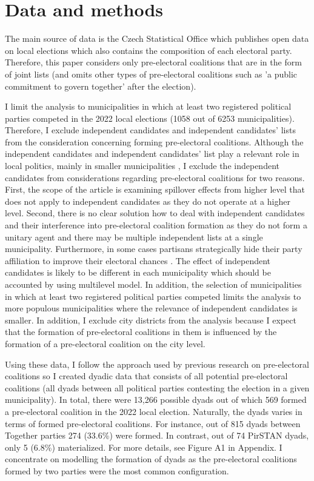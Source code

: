 \documentclass[]{interact}
\theoremstyle{plain}%
\theoremstyle{definition}
\theoremstyle{remark}
\begin{document}
\section{Data and methods}

The main source of data is the Czech Statistical Office which publishes open data on local elections which also contains the composition of each electoral party. Therefore, this paper considers only pre-electoral coalitions that are in the form of joint lists (and omits other types of pre-electoral coalitions such as 'a public commitment to govern together' after the election). 

I limit the analysis to municipalities in which at least two registered political parties competed in the 2022 local elections (1058 out of 6253 municipalities). Therefore, I exclude independent candidates and independent candidates' lists from the consideration concerning forming pre-electoral coalitions. Although the independent candidates and independent candidates' list play a relevant role in local politics, mainly in smaller municipalities \citep{kostelecky2023}, I exclude the independent candidates from considerations regarding pre-electoral coalitions for two reasons. First, the scope of the article is examining spillover effects from higher level that does not apply to independent candidates as they do not operate at a higher level. Second, there is no clear solution how to deal with independent candidates and their interference into pre-electoral coalition formation as they do not form a unitary agent and there may be multiple independent lists at a single municipality. Furthermore, in some cases partisans strategically hide their party affiliation to improve their electoral chances \citep[503]{kostelecky2023,gendzwill2012}. The effect of independent candidates is likely to be different in each municipality which should be accounted by using multilevel model. 
In addition, the selection of municipalities in which at least two registered political parties competed limits the analysis to more populous municipalities where the relevance of independent candidates is smaller. In addition, I exclude city districts from the analysis because I expect that the formation of pre-electoral coalitions in them is influenced by the formation of a pre-electoral coalition on the city level. 

Using these data, I follow the approach used by previous research on pre-electoral coalitions \citep{golder2005,ibenskas2016} so I created dyadic data that consists of all potential pre-electoral coalitions (all dyads between all political parties contesting the election in a given municipality). In total, there were 13,266 possible dyads out of which 569 formed a pre-electoral coalition in the 2022 local election. Naturally, the dyads varies in terms of formed pre-electoral coalitions. For instance, out of 815 dyads between Together parties 274 (33.6\%) were formed. In contrast, out of 74 PirSTAN dyads, only 5 (6.8\%) materialized. For more details, see Figure A1 in Appendix. I concentrate on modelling the formation of dyads as the pre-electoral coalitions formed by two parties were the most common configuration.
\end{document}
